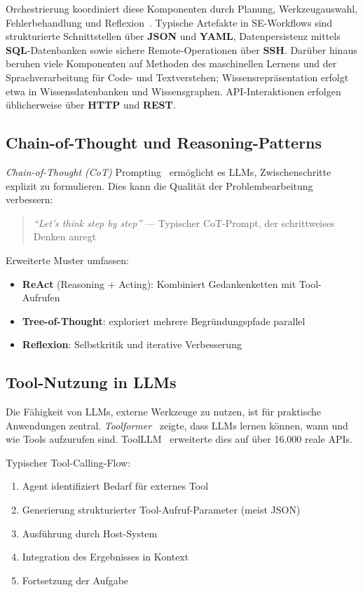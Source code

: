 Orchestrierung koordiniert diese Komponenten durch Planung, Werkzeugauswahl, Fehlerbehandlung und Reflexion~\cite{yao2023react}. Typische Artefakte in SE-Workflows sind strukturierte Schnittstellen über \textbf{JSON} und \textbf{YAML}, Datenpersistenz mittels \textbf{SQL}-Datenbanken sowie sichere Remote-Operationen über \textbf{SSH}. Darüber hinaus beruhen viele Komponenten auf Methoden des maschinellen Lernens und der Sprachverarbeitung für Code- und Textverstehen; Wissensrepräsentation erfolgt etwa in Wissensdatenbanken und Wissensgraphen. API-Interaktionen erfolgen üblicherweise über \textbf{HTTP} und \textbf{REST}.

\subsection{Chain-of-Thought und Reasoning-Patterns}

\emph{Chain-of-Thought (CoT)} Prompting~\cite{wei2022chain} ermöglicht es LLMs, Zwischenschritte explizit zu formulieren. Dies kann die Qualität der Problembearbeitung verbessern:

\begin{quote}
\textit{\enquote{Let's think step by step}} — Typischer CoT-Prompt, der schrittweises Denken anregt
\end{quote}

Erweiterte Muster umfassen:
\begin{itemize}
  \item \textbf{ReAct} (Reasoning + Acting): Kombiniert Gedankenketten mit Tool-Aufrufen~\cite{yao2023react}
  \item \textbf{Tree-of-Thought}: exploriert mehrere Begründungspfade parallel
  \item \textbf{Reflexion}: Selbstkritik und iterative Verbesserung~\cite{shinn2023reflexion}
\end{itemize}

\subsection{Tool-Nutzung in LLMs}

Die Fähigkeit von LLMs, externe Werkzeuge zu nutzen, ist für praktische Anwendungen zentral. \emph{Toolformer}~\cite{schick2023toolformer} zeigte, dass LLMs lernen können, wann und wie Tools aufzurufen sind. ToolLLM~\cite{qin2023tool} erweiterte dies auf über 16.000 reale APIs.

Typischer Tool-Calling-Flow:
\begin{enumerate}
  \item Agent identifiziert Bedarf für externes Tool
  \item Generierung strukturierter Tool-Aufruf-Parameter (meist JSON)
  \item Ausführung durch Host-System
  \item Integration des Ergebnisses in Kontext
  \item Fortsetzung der Aufgabe
\end{enumerate}

